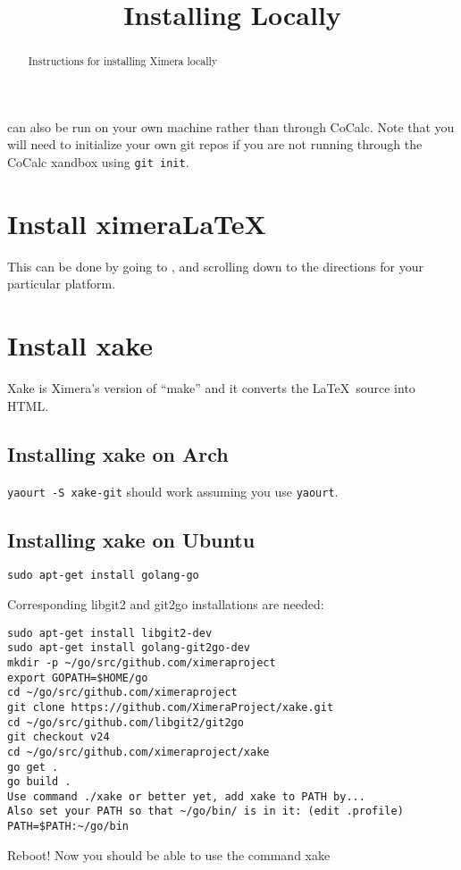 \documentclass{ximera}
\title{Installing Locally}
\begin{document}
\begin{abstract}
Instructions for installing Ximera locally
\end{abstract}
\maketitle



 can also be run on your own machine rather than through CoCalc. Note that you will need to initialize your own git repos if you are not running through the CoCalc xandbox using \verb!git init!.

\section{Install ximeraLaTeX}

This can be done by going to , and scrolling
down to the directions for your particular platform.




\section{Install xake}

Xake is Ximera's version of ``make'' and it converts the
\LaTeX\ source into HTML.

\subsection{Installing xake on Arch}

\verb!yaourt -S xake-git! should work assuming you use \texttt{yaourt}.

  
\subsection{Installing xake on Ubuntu}
\begin{verbatim}
sudo apt-get install golang-go
\end{verbatim}
Corresponding libgit2 and git2go installations are needed:
\begin{verbatim}
sudo apt-get install libgit2-dev
sudo apt-get install golang-git2go-dev
mkdir -p ~/go/src/github.com/ximeraproject
export GOPATH=$HOME/go
cd ~/go/src/github.com/ximeraproject
git clone https://github.com/XimeraProject/xake.git
cd ~/go/src/github.com/libgit2/git2go
git checkout v24
cd ~/go/src/github.com/ximeraproject/xake
go get .
go build .
Use command ./xake or better yet, add xake to PATH by...
Also set your PATH so that ~/go/bin/ is in it: (edit .profile)
PATH=$PATH:~/go/bin
\end{verbatim}
Reboot!  Now you should be able to use the command xake
\end{document}
